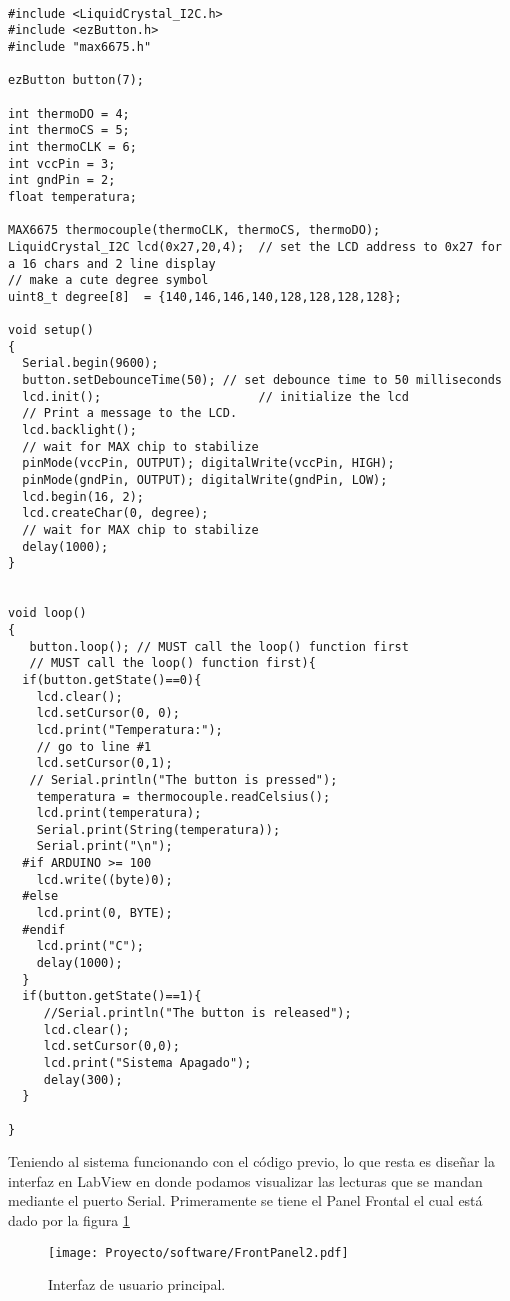 \begin{lstlisting}[label={list:first}, style=Arduino, caption=PFinalIV.ino]

#include <LiquidCrystal_I2C.h>
#include <ezButton.h>
#include "max6675.h"

ezButton button(7);

int thermoDO = 4;
int thermoCS = 5;
int thermoCLK = 6;
int vccPin = 3;
int gndPin = 2;
float temperatura;

MAX6675 thermocouple(thermoCLK, thermoCS, thermoDO);
LiquidCrystal_I2C lcd(0x27,20,4);  // set the LCD address to 0x27 for a 16 chars and 2 line display
// make a cute degree symbol
uint8_t degree[8]  = {140,146,146,140,128,128,128,128};

void setup()
{
  Serial.begin(9600);
  button.setDebounceTime(50); // set debounce time to 50 milliseconds
  lcd.init();                      // initialize the lcd 
  // Print a message to the LCD.
  lcd.backlight();
  // wait for MAX chip to stabilize
  pinMode(vccPin, OUTPUT); digitalWrite(vccPin, HIGH);
  pinMode(gndPin, OUTPUT); digitalWrite(gndPin, LOW);
  lcd.begin(16, 2);
  lcd.createChar(0, degree);
  // wait for MAX chip to stabilize
  delay(1000);
}


void loop()
{
   button.loop(); // MUST call the loop() function first
   // MUST call the loop() function first){
  if(button.getState()==0){
    lcd.clear();
    lcd.setCursor(0, 0);
    lcd.print("Temperatura:");
    // go to line #1
    lcd.setCursor(0,1);
   // Serial.println("The button is pressed");
    temperatura = thermocouple.readCelsius();
    lcd.print(temperatura);
    Serial.print(String(temperatura));
    Serial.print("\n");
  #if ARDUINO >= 100
    lcd.write((byte)0);
  #else
    lcd.print(0, BYTE);
  #endif
    lcd.print("C");
    delay(1000);
  }
  if(button.getState()==1){
     //Serial.println("The button is released");
     lcd.clear();
     lcd.setCursor(0,0);
     lcd.print("Sistema Apagado");
     delay(300);
  }
  
}
\end{lstlisting}

Teniendo al sistema funcionando con el código previo, lo que resta es diseñar la interfaz en LabView en donde podamos visualizar las lecturas que se mandan mediante el puerto Serial. Primeramente se tiene el Panel Frontal el cual está dado por la figura \ref{FrontPanel}

\clearpage


\begin{figure}[!h]
\centering
\texttt{[image: Proyecto/software/FrontPanel2.pdf]}
\caption{Interfaz de usuario principal.}
\label{FrontPanel}
\end{figure}
\clearpage

